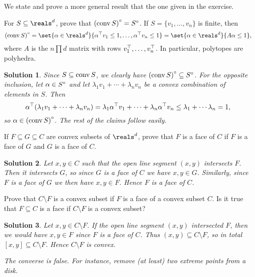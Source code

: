 \documentclass[article, a4paper, 11pt, oneside]{memoir}
\numberwithin{equation}{chapter}
\theoremstyle{nonumberplain}
\newtheorem{solution}{Solution}
\begin{document}
\begin{exerciseframed*}[9]
    We state and prove a more general result that the one given in the exercise.

    For $S \subseteq \reals^d$, prove that ${(\operatorname{conv} S)}^{\circ} = {S}^{\circ}$. If $S = \{v_1, \ldots, v_n\}$ is finite, then
    \begin{equation*}
        \polar{(\conv S)}
            = \set{\alpha \in \reals^d}{\alpha\trans v_1 \leq 1, \ldots, \alpha\trans v_n \leq 1}
            = \set{\alpha \in \reals^d}{A\alpha \leq 1},
    \end{equation*}
    where $A$ is the $n \prod d$ matrix with rows $v_1^{\top}, \ldots, v_n^{\top}$. In particular, polytopes are polyhedra.
\end{exerciseframed*}

\begin{solution}
    Since $S \subseteq \operatorname{conv} S$, we clearly have ${(\operatorname{conv} S)}^{\circ} \subseteq {S}^{\circ}$. For the opposite inclusion, let $\alpha \in {S}^{\circ}$ and let $\lambda_1 v_1 + \cdots + \lambda_n v_n$ be a convex combination of elements in $S$. Then
    \begin{equation*}
        \alpha^{\top}(\lambda_1 v_1 + \cdots + \lambda_n v_n)
            = \lambda_1 \alpha^{\top} v_1 + \cdots + \lambda_n \alpha^{\top} v_n
            \leq \lambda_1 + \cdots \lambda_n
            = 1,
    \end{equation*}
    so $\alpha \in {(\operatorname{conv}S)}^{\circ}$. The rest of the claims follow easily.
\end{solution}


\begin{exerciseframed*}[10]
    If $F \subseteq G \subseteq C$ are convex subsets of $\reals^d$, prove that $F$ is a face of $C$ if $F$ is a face of $G$ and $G$ is a face of $C$.
\end{exerciseframed*}

\begin{solution}
    Let $x,y \in C$ such that the open line segment $(x,y)$ intersects $F$. Then it intersects $G$, so since $G$ is a face of $C$ we have $x,y \in G$. Similarly, since $F$ is a face of $G$ we then have $x,y \in F$. Hence $F$ is a face of $C$.
\end{solution}


\begin{exerciseframed*}[12]
    Prove that $C \setminus F$ is a convex subset if $F$ is a face of a convex subset $C$. Is it true that $F \subseteq C$ is a face if $C \setminus F$ is a convex subset?
\end{exerciseframed*}

\begin{solution}
    Let $x,y \in C \setminus F$. If the open line segment $(x,y)$ intersected $F$, then we would have $x,y \in F$ since $F$ is a face of $C$. Thus $(x,y) \subseteq C \setminus F$, so in total $[x,y] \subseteq C \setminus F$. Hence $C \setminus F$ is convex.

    The converse is false. For instance, remove (at least) two extreme points from a disk.
\end{solution}
\end{document}
